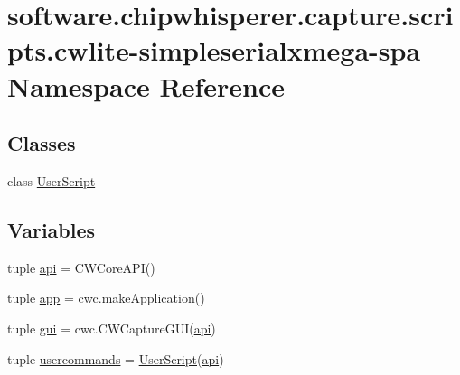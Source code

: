 \hypertarget{namespacesoftware_1_1chipwhisperer_1_1capture_1_1scripts_1_1cwlite-simpleserialxmega-spa}{}\section{software.\+chipwhisperer.\+capture.\+scripts.\+cwlite-\/simpleserialxmega-\/spa Namespace Reference}
\label{namespacesoftware_1_1chipwhisperer_1_1capture_1_1scripts_1_1cwlite-simpleserialxmega-spa}
\subsection*{Classes}
\begin{DoxyCompactItemize}
\item 
class \hyperlink{classsoftware_1_1chipwhisperer_1_1capture_1_1scripts_1_1cwlite-simpleserialxmega-spa_1_1UserScript}{User\+Script}
\end{DoxyCompactItemize}
\subsection*{Variables}
\begin{DoxyCompactItemize}
\item 
tuple \hyperlink{namespacesoftware_1_1chipwhisperer_1_1capture_1_1scripts_1_1cwlite-simpleserialxmega-spa_a516520bd4dcd77d2e1fd5ffbdb0b8d90}{api} = C\+W\+Core\+A\+P\+I()
\item 
tuple \hyperlink{namespacesoftware_1_1chipwhisperer_1_1capture_1_1scripts_1_1cwlite-simpleserialxmega-spa_abf1e3d28260421a60b7ad0882c0c2c36}{app} = cwc.\+make\+Application()
\item 
tuple \hyperlink{namespacesoftware_1_1chipwhisperer_1_1capture_1_1scripts_1_1cwlite-simpleserialxmega-spa_ab5f9c7367f23264ce6feedd951ba8e2a}{gui} = cwc.\+C\+W\+Capture\+G\+U\+I(\hyperlink{namespacesoftware_1_1chipwhisperer_1_1capture_1_1scripts_1_1cwlite-simpleserialxmega-spa_a516520bd4dcd77d2e1fd5ffbdb0b8d90}{api})
\item 
tuple \hyperlink{namespacesoftware_1_1chipwhisperer_1_1capture_1_1scripts_1_1cwlite-simpleserialxmega-spa_acd034c3e1d25b120839a7e1bf1fdbed0}{usercommands} = \hyperlink{classsoftware_1_1chipwhisperer_1_1capture_1_1scripts_1_1cwlite-simpleserialxmega-spa_1_1UserScript}{User\+Script}(\hyperlink{namespacesoftware_1_1chipwhisperer_1_1capture_1_1scripts_1_1cwlite-simpleserialxmega-spa_a516520bd4dcd77d2e1fd5ffbdb0b8d90}{api})
\end{DoxyCompactItemize}


